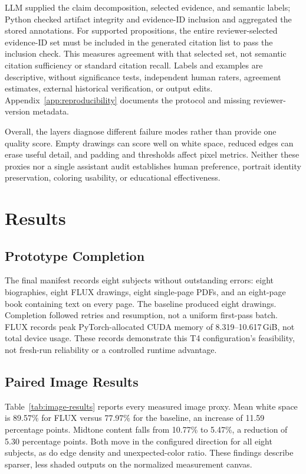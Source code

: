 \documentclass[11pt]{article}
\begin{document}
LLM supplied the claim decomposition, selected evidence, and semantic labels; Python checked artifact integrity and evidence-ID inclusion and aggregated the stored annotations. For supported propositions, the entire reviewer-selected evidence-ID set must be included in the generated citation list to pass the inclusion check. This measures agreement with that selected set, not semantic citation sufficiency or standard citation recall. Labels and examples are descriptive, without significance tests, independent human raters, agreement estimates, external historical verification, or output edits. Appendix~\ref{app:reproducibility} documents the protocol and missing reviewer-version metadata.

Overall, the layers diagnose different failure modes rather than provide one quality score. Empty drawings can score well on white space, reduced edges can erase useful detail, and padding and thresholds affect pixel metrics. Neither these proxies nor a single assistant audit establishes human preference, portrait identity preservation, coloring usability, or educational effectiveness.

\section{Results}
\label{sec:results}

\subsection{Prototype Completion}

The final manifest records eight subjects without outstanding errors: eight biographies, eight FLUX drawings, eight single-page PDFs, and an eight-page book containing text on every page. The baseline produced eight drawings. Completion followed retries and resumption, not a uniform first-pass batch. FLUX records peak PyTorch-allocated CUDA memory of 8.319--10.617\,GiB, not total device usage. These records demonstrate this T4 configuration's feasibility, not fresh-run reliability or a controlled runtime advantage.

\subsection{Paired Image Results}

Table~\ref{tab:image-results} reports every measured image proxy. Mean white space is 89.57\% for FLUX versus 77.97\% for the baseline, an increase of 11.59 percentage points. Midtone content falls from 10.77\% to 5.47\%, a reduction of 5.30 percentage points. Both move in the configured direction for all eight subjects, as do edge density and unexpected-color ratio. These findings describe sparser, less shaded outputs on the normalized measurement canvas.
\end{document}
